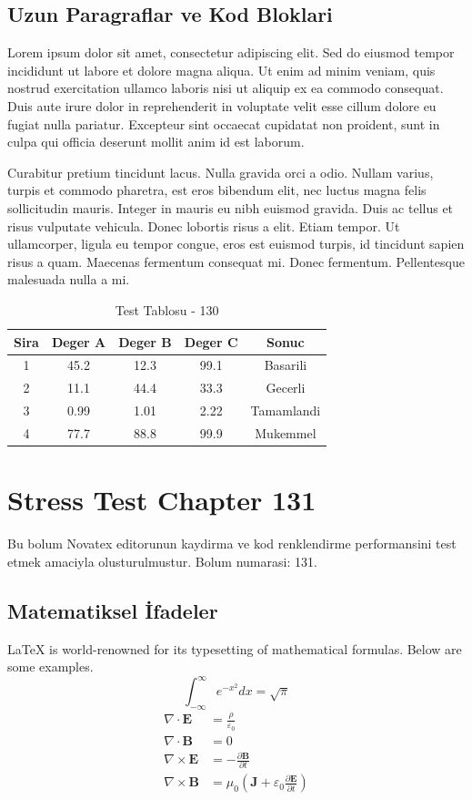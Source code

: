 \documentclass[12pt,a4paper]{article}
\begin{document}
\subsection{Uzun Paragraflar ve Kod Bloklari}
Lorem ipsum dolor sit amet, consectetur adipiscing elit. Sed do eiusmod tempor incididunt ut labore et dolore magna aliqua. Ut enim ad minim veniam, quis nostrud exercitation ullamco laboris nisi ut aliquip ex ea commodo consequat. Duis aute irure dolor in reprehenderit in voluptate velit esse cillum dolore eu fugiat nulla pariatur. Excepteur sint occaecat cupidatat non proident, sunt in culpa qui officia deserunt mollit anim id est laborum.

Curabitur pretium tincidunt lacus. Nulla gravida orci a odio. Nullam varius, turpis et commodo pharetra, est eros bibendum elit, nec luctus magna felis sollicitudin mauris. Integer in mauris eu nibh euismod gravida. Duis ac tellus et risus vulputate vehicula. Donec lobortis risus a elit. Etiam tempor. Ut ullamcorper, ligula eu tempor congue, eros est euismod turpis, id tincidunt sapien risus a quam. Maecenas fermentum consequat mi. Donec fermentum. Pellentesque malesuada nulla a mi.

\begin{table}[h!]
\centering
\begin{tabular}{|c|c|c|c|c|}
\hline
\textbf{Sira} & \textbf{Deger A} & \textbf{Deger B} & \textbf{Deger C} & \textbf{Sonuc} \\
\hline
1 & 45.2 & 12.3 & 99.1 & Basarili \\
2 & 11.1 & 44.4 & 33.3 & Gecerli \\
3 & 0.99 & 1.01 & 2.22 & Tamamlandi \\
4 & 77.7 & 88.8 & 99.9 & Mukemmel \\
\hline
\end{tabular}
\caption{Test Tablosu - 130}
\end{table}

\newpage
\section{Stress Test Chapter 131}
Bu bolum Novatex editorunun kaydirma ve kod renklendirme performansini test etmek amaciyla olusturulmustur. Bolum numarasi: 131.

\subsection{Matematiksel İfadeler}
\LaTeX{} is world-renowned for its typesetting of mathematical formulas. Below are some examples.
\begin{equation}
\int_{-\infty}^{\infty} e^{-x^2} dx = \sqrt{\pi}
\end{equation}
\begin{align}
\nabla \cdot \mathbf{E} &= \frac{\rho}{\varepsilon_0} \\
\nabla \cdot \mathbf{B} &= 0 \\
\nabla \times \mathbf{E} &= -\frac{\partial \mathbf{B}}{\partial t} \\
\nabla \times \mathbf{B} &= \mu_0\left(\mathbf{J} + \varepsilon_0 \frac{\partial \mathbf{E}}{\partial t}\right)
\end{align}
\end{document}
